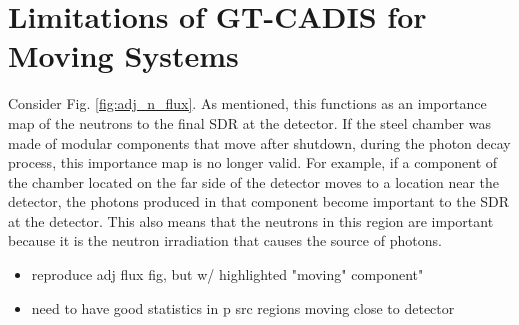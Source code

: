 
\section{Limitations of GT-CADIS for Moving Systems}

Consider Fig. \ref{fig:adj_n_flux}.  As mentioned, this functions as an
importance map of the neutrons to the final SDR at the detector.  If the steel
chamber was made of modular components that move after shutdown, during the
photon decay process, this importance map is no longer valid.  For example, if
a component of the chamber located on the far side of the detector moves to a
location near the detector, the photons produced in that component become
important to the SDR at the detector.  This also means that the neutrons in
this region are important because it is the neutron irradiation that causes the
source of photons.


\begin{itemize}
	\item reproduce adj flux fig, but w/ highlighted "moving" component"
	\item need to have good statistics in p src regions moving
			close to detector
\end{itemize}
